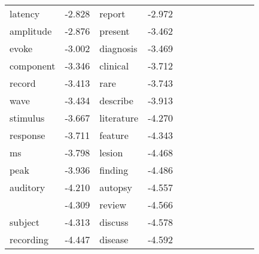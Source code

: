 \documentclass{article}
\begin{document}
\begin{table}
{\begin{tabular}{|l r|l r|l r|l r|l r|l r|}
latency & -2.828 & report & -2.972\\
amplitude & -2.876 & present & -3.462\\
evoke & -3.002 & diagnosis & -3.469\\
component & -3.346 & clinical & -3.712\\
record & -3.413 & rare & -3.743\\
wave & -3.434 & describe & -3.913\\
stimulus & -3.667 & literature & -4.270\\
response & -3.711 & feature & -4.343\\
ms & -3.798 & lesion & -4.468\\
peak & -3.936 & finding & -4.486\\
auditory & -4.210 & autopsy & -4.557\\
 & -4.309 & review & -4.566\\
subject & -4.313 & discuss & -4.578\\
recording & -4.447 & disease & -4.592\\
\hline
\end{tabular}
}
\end{table}
\begin{table}
\centering
{}
\end{table}
\end{document}
